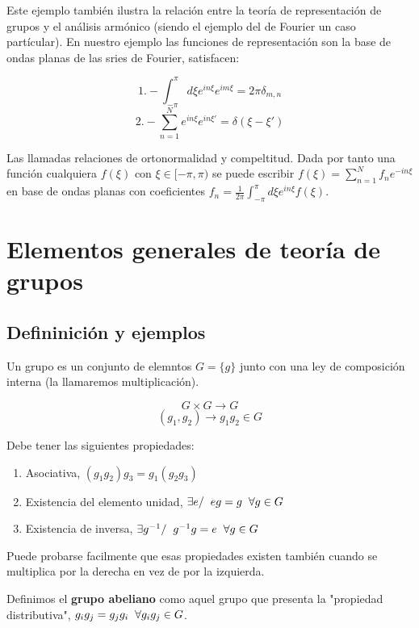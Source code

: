 \documentclass{article}
\begin{document}
\smallskip
Este ejemplo también ilustra la relación entre la teoría de representación de grupos y el análisis armónico (siendo el ejemplo del de Fourier un caso partícular). En nuestro ejemplo las funciones de representación son la base de ondas planas de las sries de Fourier, satisfacen:

$$1.- \int ^\pi _{-\pi} d\xi e^{in\xi} e^{im\xi} =2\pi \delta _{m,n}$$
$$2.- \sum _{n=1}^N e^{in\xi}e^{in\xi '}=\delta (\xi-\xi ')$$

Las llamadas relaciones de ortonormalidad y compeltitud. Dada por tanto una función cualquiera $f(\xi)$ con $\xi \in [-\pi,\pi)$ se puede escribir $f(\xi)=\sum _{n=1}^N f_ne^{-in\xi}$ en base de ondas planas con coeficientes $f_n=\frac{1}{2\pi}\int^\pi _{-\pi}d\xi e^{in\xi}f(\xi)$.






\newpage

\section{Elementos generales de teoría de grupos}
\subsection{Defininición y ejemplos}
Un grupo es un conjunto de elemntos $G=\lbrace g\rbrace$ junto con una ley de composición interna (la llamaremos multiplicación).

$$G\times G\rightarrow G$$
$$(g_1,g_2)\rightarrow g_1g_2 \in G$$

Debe tener las siguientes propiedades:

\begin{enumerate}
    \item Asociativa, $ (g_1g_2)g_3=g_1(g_2g_3)$
    \item Existencia del elemento unidad, $\exists e / \hspace{0.2cm} eg=g\hspace{0.2cm} \forall g\in G$
    \item Existencia de inversa, $\exists g^{-1} / \hspace{0.2cm} g^{-1}g=e \hspace{0.2cm} \forall g\in G$
\end{enumerate}

Puede probarse facilmente que esas propiedades existen también cuando se multiplica por la derecha en vez de por la izquierda.

\smallskip
Definimos el \textbf{grupo abeliano} como aquel grupo que presenta la "propiedad distributiva", $g_ig_j=g_jg_i \hspace{0.2cm} \forall g_ig_j \in G$.
\end{document}
